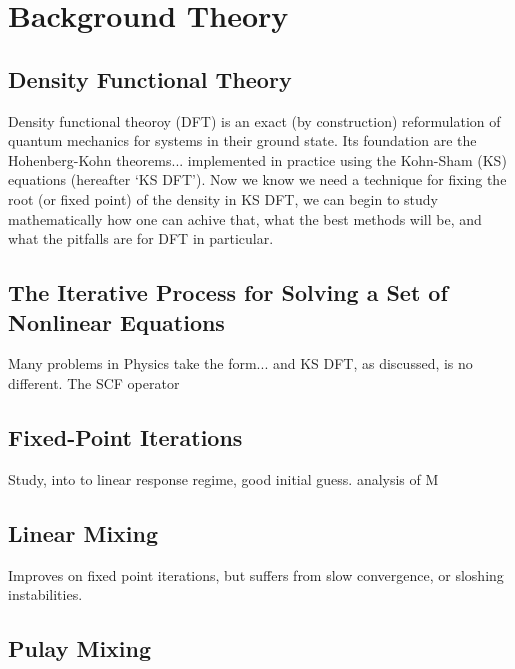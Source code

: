 \documentclass[final,3p,twocolumn]{elsarticle}
\begin{document}
\section{Background Theory}


\subsection{Density Functional Theory}
\label{sec:DFT}

Density functional theoroy (DFT) is an exact (by construction) reformulation of quantum mechanics for systems in their ground state. Its foundation are the Hohenberg-Kohn theorems... implemented in practice using the Kohn-Sham (KS) equations (hereafter `KS DFT'). Now we know we need a technique for fixing the root (or fixed point) of the density in KS DFT, we can begin to study mathematically how one can achive that, what the best methods will be, and what the pitfalls are for DFT in particular. 


\subsection{The Iterative Process for Solving a Set of Nonlinear Equations}

Many problems in Physics take the form... and KS DFT, as discussed, is no different. The SCF operator 

\subsection{Fixed-Point Iterations}

Study, into to linear response regime, good initial guess. analysis of M

\subsection{Linear Mixing}

Improves on fixed point iterations, but suffers from slow convergence, or sloshing instabilities.

\subsection{Pulay Mixing}
\end{document}
